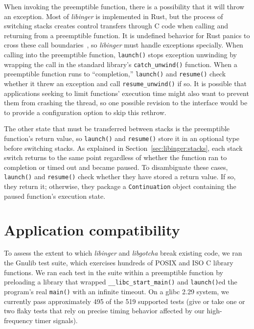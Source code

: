 When invoking the preemptible function, there is a possibility that it will throw an
exception.  Most of \textit{libinger} is implemented in Rust, but the process of
switching stacks creates control transfers through C code when calling and returning
from a preemptible function.  It is undefined behavior for Rust panics to cross these
call boundaries~\cite{www-rustlang-ub}, so \textit{libinger} must handle exceptions
specially.  When calling into the preemptible function, \texttt{launch()} stops
exception unwinding by wrapping the call in the standard library's
\texttt{catch\_unwind()} function.  When a preemptible function runs to
``completion,'' \texttt{launch()} and \texttt{resume()} check whether it threw an
exception and call \texttt{resume\_unwind()} if so.  It is possible that applications
seeking to limit functions' execution time might also want to prevent them from
crashing the thread, so one possible revision to the interface would be to provide a
configuration option to skip this rethrow.

The other state that must be transferred between stacks is the preemptible function's
return value, so \texttt{launch()} and \texttt{resume()} store it in an optional type
before switching stacks.  As explained in Section~\ref{sec:libinger:stacks}, each
stack switch returns to the same point regardless of whether the function ran to
completion or timed out and became paused.  To disambiguate these cases,
\texttt{launch()} and \texttt{resume()} check whether they have stored a return
value.  If so, they return it; otherwise, they package a \texttt{Continuation} object
containing the paused function's execution state.


\section{Application compatibility}
\label{sec:libinger:compatibility}

To assess the extent to which \textit{libinger} and \textit{libgotcha} break existing
code, we ran the Gnulib test suite, which exercises hundreds of POSIX and ISO C
library functions.  We ran each test in the suite within a preemptible function by
preloading a library that wrapped \texttt{\_\_libc\_start\_main()} and
\texttt{launch()}ed the program's real \texttt{main()} with an infinite timeout.  On
a glibc 2.29 system, we currently pass approximately 495 of the 519 supported tests
(give or take one or two flaky tests that rely on precise timing behavior affected by
our high-frequency timer signals).


